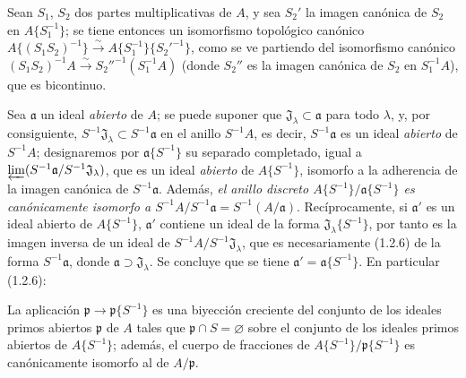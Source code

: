 \begin{env}[7.6.8]
\label{0.7.6.8-fr}
Sean $S_1$, $S_2$ dos partes multiplicativas de $A$, y sea $S_2'$ la imagen
canónica de $S_2$ en $A\{S_1^{-1}\}$; se tiene entonces un isomorfismo
topológico canónico
$A\{(S_1S_2)^{-1}\}\xrightarrow{\sim}A\{S_1^{-1}\}\{{S_2'}^{-1}\}$,
como se ve partiendo del isomorfismo canónico
$(S_1S_2)^{-1}A\xrightarrow{\sim}{S_2''}^{-1}(S_1^{-1}A)$ (donde $S_2''$ es
la imagen canónica de $S_2$ en $S_1^{-1}A$), que es bicontinuo.
\end{env}

\begin{env}[7.6.9]
\label{0.7.6.9-fr}
Sea $\mathfrak a$ un ideal \emph{abierto} de $A$; se puede suponer que
$\mathfrak J_\lambda\subset\mathfrak a$ para todo $\lambda$, y, por consiguiente,
$S^{-1}\mathfrak J_\lambda\subset S^{-1}\mathfrak a$ en el anillo
$S^{-1}A$, es decir, $S^{-1}\mathfrak a$ es un ideal \emph{abierto} de
$S^{-1}A$; designaremos por $\mathfrak a\{S^{-1}\}$ su separado completado,
igual a $\varprojlim(S^{-1}\mathfrak a/S^{-1}\mathfrak J_\lambda)$, que es un
ideal \emph{abierto} de $A\{S^{-1}\}$, isomorfo a la adherencia de la imagen
canónica de $S^{-1}\mathfrak a$. Además, \emph{el anillo discreto
$A\{S^{-1}\}/\mathfrak a\{S^{-1}\}$ es canónicamente isomorfo a
$S^{-1}A/S^{-1}\mathfrak a=S^{-1}(A/\mathfrak a)$}. Recíprocamente, si
$\mathfrak a'$ es un ideal abierto de $A\{S^{-1}\}$, $\mathfrak a'$ contiene
un ideal de la forma $\mathfrak J_\lambda\{S^{-1}\}$, por tanto es la imagen
inversa de un ideal de $S^{-1}A/S^{-1}\mathfrak J_\lambda$, que es
necesariamente (1.2.6) de la forma $S^{-1}\mathfrak a$, donde
$\mathfrak a\supset\mathfrak J_\lambda$. Se concluye que se tiene
$\mathfrak a'=\mathfrak a\{S^{-1}\}$. En particular (1.2.6):
\end{env}

\begin{proposition}[7.6.10]
\label{0.7.6.10-fr}
La aplicación $\mathfrak p\to\mathfrak p\{S^{-1}\}$ es una biyección
creciente del conjunto de los ideales \textup{primos abiertos} $\mathfrak p$ de $A$ tales
que $\mathfrak p\cap S=\varnothing$ sobre el conjunto de los ideales \textup{primos abiertos}
de $A\{S^{-1}\}$; además, el cuerpo de fracciones de
$A\{S^{-1}\}/\mathfrak p\{S^{-1}\}$ es canónicamente isomorfo al de
$A/\mathfrak p$.
\end{proposition}

